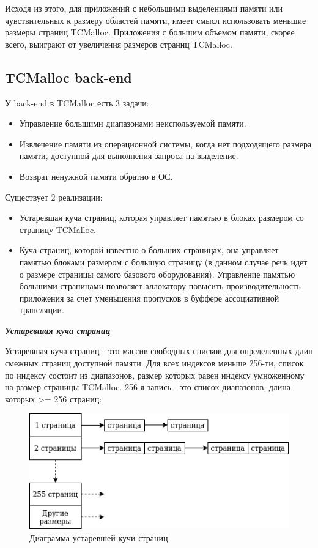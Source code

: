 Исходя из этого, для приложений с небольшими выделениями памяти или чувствительных к размеру областей памяти, имеет смысл использовать меньшие размеры страниц TCMalloc. Приложения с большим объемом памяти, скорее всего, выиграют от увеличения размеров страниц TCMalloc.

\subsection{TCMalloc back-end }
У back-end в TCMalloc есть 3 задачи:
\begin{itemize}
	\item Управление большими диапазонами неиспользуемой памяти.
	\item Извлечение памяти из операционной системы, когда нет подходящего размера памяти, доступной для выполнения запроса на выделение.
	\item Возврат ненужной памяти обратно в ОС.
\end{itemize}

Существует 2 реализации:
\begin{itemize}
	\item Устаревшая куча страниц, которая управляет памятью в блоках размером со страницу TCMalloc.
	\item Куча страниц, которой известно о больших страницах, она управляет памятью блоками размером с большую страницу (в данном случае речь идет о размере страницы самого базового оборудования). Управление памятью большими страницами позволяет аллокатору повысить производительность приложения за счет уменьшения пропусков в буффере ассоциативной трансляции.
\end{itemize}

\bigbreak
\textit{\textbf{Устаревшая куча страниц}}

Устаревшая куча страниц - это массив свободных списков для определенных длин смежных страниц доступной памяти. Для всех индексов меньше 256-ти, список по индексу состоит из диапазонов, размер которых равен индексу умноженному на размер страницы TCMalloc. 256-я запись - это список диапазонов, длина которых >= 256 страниц:

\begin{figure}[!h]
	\begin{center}
		\includegraphics[scale=0.6]{images/tcmalloc-legacy-pageheap.png}
		\caption{Диаграмма устаревшей кучи страниц.}
		\label{tcmalloc-legacy-pageheap}
	\end{center}
\end{figure}

